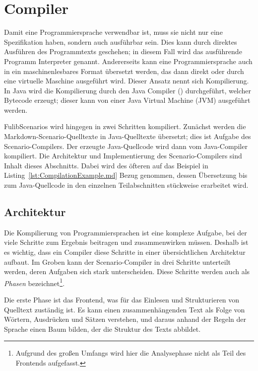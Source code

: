 \section{Compiler}\label{sec:compiler}

Damit eine Programmiersprache verwendbar ist, muss sie nicht nur eine Spezifikation haben, sondern auch ausführbar sein.
Dies kann durch direktes Ausführen des Programmtexts geschehen;
in diesem Fall wird das ausführende Programm Interpreter genannt.
Andererseits kann eine Programmiersprache auch in ein maschinenlesbares Format übersetzt werden,
das dann direkt oder durch eine virtuelle Maschine ausgeführt wird.
Dieser Ansatz nennt sich Kompilierung.
In Java wird die Kompilierung durch den Java Compiler () durchgeführt, welcher Bytecode erzeugt;
dieser kann von einer Java Virtual Machine (JVM) ausgeführt werden.

FulibScenarios wird hingegen in zwei Schritten kompiliert.
Zunächst werden die Markdown-Scenario-Quelltexte in Java-Quelltexte übersetzt;
dies ist Aufgabe des Scenario-Compilers.
Der erzeugte Java-Quellcode wird dann vom Java-Compiler kompiliert.
Die Architektur und Implementierung des Scenario-Compilers sind Inhalt dieses Abschnitts.
Dabei wird des öfteren auf das Beispiel in Listing~\ref{lst:CompilationExample.md} Bezug genommen,
dessen Übersetzung bis zum Java-Quellcode in den einzelnen Teilabschnitten stückweise erarbeitet wird.


\subsection{Architektur}\label{subsec:compiler-architecture}

Die Kompilierung von Programmiersprachen ist eine komplexe Aufgabe,
bei der viele Schritte zum Ergebnis beitragen und zusammenwirken müssen.
Deshalb ist es wichtig, dass ein Compiler diese Schritte in einer übersichtlichen Architektur aufbaut.
Im Groben kann der Scenario-Compiler in drei Schritte unterteilt werden,
deren Aufgaben sich stark unterscheiden.
Diese Schritte werden auch als \emph{Phasen}\cite[4]{dragonbook} bezeichnet\footnote{Aufgrund des großen Umfangs wird hier die Analysephase nicht als Teil des Frontends aufgefasst.}.

Die erste Phase ist das Frontend, was für das Einlesen und Strukturieren von Quelltext zuständig ist.
Es kann einen zusammenhängenden Text als Folge von Wörtern, Ausdrücken und Sätzen verstehen,
und daraus anhand der Regeln der Sprache einen Baum bilden,
der die Struktur des Texts abbildet.

